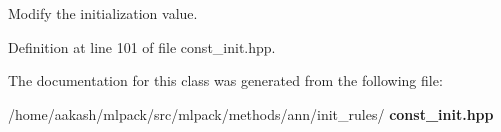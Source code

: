Modify the initialization value. 



Definition at line 101 of file const\+\_\+init.\+hpp.



The documentation for this class was generated from the following file\+:\begin{DoxyCompactItemize}
\item 
/home/aakash/mlpack/src/mlpack/methods/ann/init\+\_\+rules/\textbf{ const\+\_\+init.\+hpp}\end{DoxyCompactItemize}
